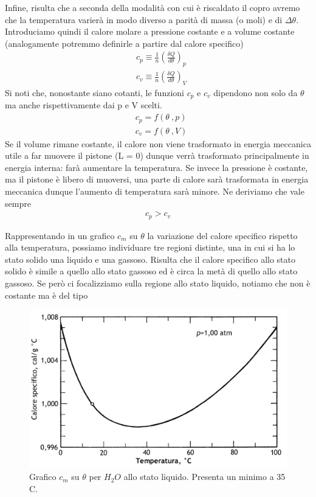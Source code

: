 \documentclass[
10pt, %
a4paper, %
oneside, %
headinclude,footinclude, %
BCOR5mm, %
]{scrartcl}
\begin{document}
Infine, risulta che a seconda della modalità con cui è riscaldato il copro avremo che la temperatura varierà in modo diverso a parità di massa (o moli) e di $\Delta \theta$. Introduciamo quindi il calore molare a pressione costante e a volume costante (analogamente potremmo definirle a partire dal calore specifico)
\begin{align*} 
	&c_p \equiv \frac{1}{n} \left(\frac{\delta Q}{d\theta}\right)_p \\
	&c_v \equiv \frac{1}{n} \left(\frac{\delta Q}{d\theta}\right)_V
\end{align*} 
Si noti che, nonostante siano cotanti, le funzioni $c_p$ e $c_v$ dipendono non solo da $\theta$ ma anche rispettivamente dai p e V scelti. 
\begin{align*} 
	&c_p = f(\theta\ , p)\\
	&c_v = f(\theta\ , V)
\end{align*} 
Se il volume rimane costante, il calore non viene trasformato in energia meccanica utile a far muovere il pistone (L = 0) dunque verrà trasformato principalmente in energia interna: farà aumentare la temperatura. Se invece la pressione è costante, ma il pistone è libero di muoversi, una parte di calore sarà trasformata in energia meccanica dunque l'aumento di temperatura sarà minore. Ne deriviamo che vale sempre
\begin{align*} 
	c_p > c_v
\end{align*}  
\begin{exercise}[$c_p$ e $c_v$ di $H_2 O$]
	Rappresentando in un grafico $c_m$ su $\theta$ la variazione del calore specifico rispetto alla temperatura, possiamo individuare tre regioni distinte, una in cui si ha lo stato solido una liquido e una gassoso. Risulta che il calore specifico allo stato solido è simile a quello allo stato gassoso ed è circa la metà di quello allo stato gassoso. Se però ci focalizziamo sulla regione allo stato liquido, notiamo che non è costante ma è del tipo
	\begin{figure}[h!]
		\centering
		\includegraphics[width=0.7\linewidth]{"../images/calore specifico acqua"}
		\caption{Grafico $c_m$ su $\theta$ per $H_2O$ allo stato liquido. Presenta un minimo a 35 \textdegree C.}
		\label{fig:calore-specifico-acqua}
	\end{figure}
	\FloatBarrier
\end{exercise}
\end{document}
